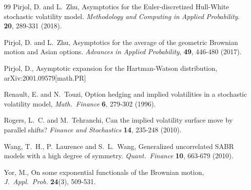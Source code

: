 \documentclass[11pt]{article}
\numberwithin{equation}{section}
\theoremstyle{plain}
\begin{document}
\begin{thebibliography}{99}
Pirjol, D. and L.~Zhu,
Asymptotics for the Euler-discretized Hull-White stochastic volatility model. 
\textit{Methodology and Computing in Applied Probability}. 
\textbf{20}, 289-331 (2018).

Pirjol, D. and L.~Zhu,
Asymptotics for the average of the geometric Brownian motion and Asian options. 
\textit{Advances in Applied Probability}, 
\textbf{49}, 446-480 (2017).

Pirjol, D.,
Asymptotic expansion for the Hartman-Watson distribution,
arXiv:2001.09579[math.PR]

Renault, E. and N.~Touzi, 
Option hedging and implied volatilities in a stochastic volatility model,
\textit{Math.~Finance} 
\textbf{6}, 279-302 (1996).

Rogers, L.~C. and M.~Tehranchi, 
Can the implied volatility surface move by parallel shifts?
\textit{Finance and Stochastics} 
\textbf{14}, 235-248 (2010).

Wang, T.~H., P.~Laurence and S.~L.~Wang,
Generalized uncorrelated SABR models with a high degree of symmetry.
\textit{Quant.~Finance} 
\textbf{10}, 663-679 (2010).

Yor, M.,
On some exponential functionals of the Brownian motion,
\textit{J.~Appl.~Prob.}
\textbf{24}(3), 509-531.

\end{thebibliography}
\end{document}
